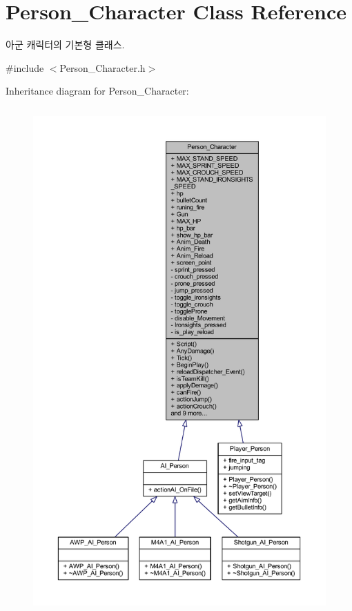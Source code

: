 \hypertarget{class_person___character}{}\section{Person\+\_\+\+Character Class Reference}
\label{class_person___character}


아군 캐릭터의 기본형 클래스.  




{\ttfamily \#include $<$Person\+\_\+\+Character.\+h$>$}



Inheritance diagram for Person\+\_\+\+Character\+:\nopagebreak
\begin{figure}[H]
\begin{center}
\leavevmode
\includegraphics[height=550pt]{class_person___character__inherit__graph}
\end{center}
\end{figure}


